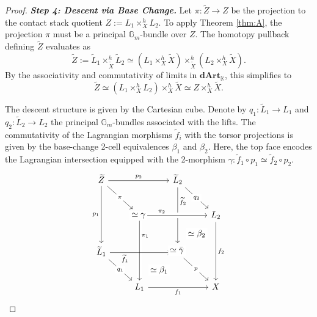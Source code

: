 \documentclass[reqno]{amsart}
\theoremstyle{definition}
\theoremstyle{remark}
\newcommand{\Gm}{\mathbb{G}_m}
\newcommand{\K}{\mathbb{K}}
\newcommand{\dArt}{\mathbf{dArt}}
\begin{document}
{\begin{proof}
  \vspace{5pt}

  \textbf{\textit{Step 4: Descent via Base Change.}}
  Let $\pi \colon \widetilde{Z} \to Z$ be the projection to the contact stack quotient $Z := L_1 \times_X^h L_2$. To apply Theorem \ref{thm:A}, the projection $\pi$ must be a principal $\Gm$-bundle over $Z$. The homotopy pullback defining $\widetilde{Z}$ evaluates as
  \begin{equation*}
    \widetilde{Z} := \widetilde{L}_1 \times_{\widetilde{X}}^h \widetilde{L}_2 \simeq (L_1 \times_X^h \widetilde{X}) \times_{\widetilde{X}}^h (L_2 \times_X^h \widetilde{X}).
  \end{equation*}
  By the associativity and commutativity of limits in $\dArt_\K$, this simplifies to
  \begin{equation*}
    \widetilde{Z} \simeq (L_1 \times_X^h L_2) \times_X^h \widetilde{X} \simeq Z \times_X^h \widetilde{X}.
  \end{equation*}
  
  The descent structure is given by the Cartesian cube. Denote by $q_1 \colon \widetilde{L}_1 \to L_1$ and $q_2 \colon \widetilde{L}_2 \to L_2$ the principal $\Gm$-bundles associated with the lifts. The commutativity of the Lagrangian morphisms $\widetilde{f}_i$ with the torsor projections is given by the base-change 2-cell equivalences $\beta_1$ and $\beta_2$. Here, the top face encodes the Lagrangian intersection equipped with the 2-morphism $\gamma \colon \widetilde{f}_1 \circ p_1 \simeq \widetilde{f}_2 \circ p_2$.
  \[
    \begin{tikzcd}[row sep=2.5em, column sep=2.5em]
      \widetilde{Z} \arrow[rr, "{p_2}"] \arrow[dd, "{p_1}"'] \arrow[dr, "{\pi}" description] 
      & & \widetilde{L}_2 \arrow[dd, "{\widetilde{f}_2}" near start] \arrow[dr, "{q_2}" description] \\
      & Z \arrow[rr, "{\pi_2}" near start, crossing over] \arrow[dd, "{\pi_1}" near start, crossing over] 
      & & L_2 \arrow[dd, "{f_2}"] \\
      \widetilde{L}_1 \arrow[rr, "{\widetilde{f}_1}"' near start] \arrow[dr, "{q_1}" description] 
      & & \widetilde{X} \arrow[dr, "{p}" description] \\
      & L_1 \arrow[rr, "{f_1}"'] 
      & & X
      \arrow[from=1-1, to=3-3, phantom, "{\simeq \gamma}" description]
      \arrow[from=2-2, to=4-4, phantom, "{\simeq \bar{\gamma}}" description]
      \arrow[from=3-1, to=4-4, phantom, "{\simeq \beta_1}" description]
      \arrow[from=1-3, to=4-4, phantom, "{\simeq \beta_2}" description]
    \end{tikzcd}
  \]


\end{proof}}
\end{document}
